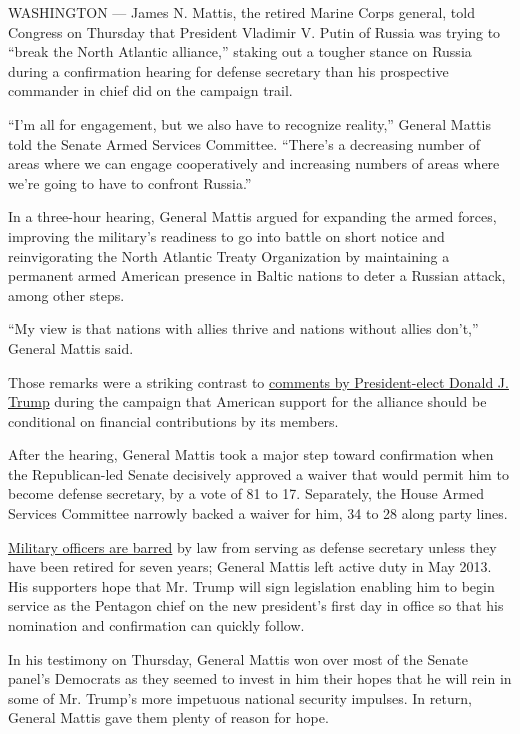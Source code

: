 WASHINGTON --- James N. Mattis, the retired Marine Corps general, told
Congress on Thursday that President Vladimir V. Putin of Russia was
trying to ``break the North Atlantic alliance,'' staking out a tougher
stance on Russia during a confirmation hearing for defense secretary
than his prospective commander in chief did on the campaign trail.

``I'm all for engagement, but we also have to recognize reality,''
General Mattis told the Senate Armed Services Committee. ``There's a
decreasing number of areas where we can engage cooperatively and
increasing numbers of areas where we're going to have to confront
Russia.''

In a three-hour hearing, General Mattis argued for expanding the armed
forces, improving the military's readiness to go into battle on short
notice and reinvigorating the North Atlantic Treaty Organization by
maintaining a permanent armed American presence in Baltic nations to
deter a Russian attack, among other steps.

``My view is that nations with allies thrive and nations without allies
don't,'' General Mattis said.

Those remarks were a striking contrast to
\href{https://www.nytimes.com/2016/07/21/us/politics/donald-trump-issues.html}{comments
by President-elect Donald J. Trump} during the campaign that American
support for the alliance should be conditional on financial
contributions by its members.

After the hearing, General Mattis took a major step toward confirmation
when the Republican-led Senate decisively approved a waiver that would
permit him to become defense secretary, by a vote of 81 to 17.
Separately, the House Armed Services Committee narrowly backed a waiver
for him, 34 to 28 along party lines.

\href{https://www.nytimes.com/2017/01/10/us/politics/james-mattis-defense-secretary.html}{Military
officers are barred} by law from serving as defense secretary unless
they have been retired for seven years; General Mattis left active duty
in May 2013. His supporters hope that Mr. Trump will sign legislation
enabling him to begin service as the Pentagon chief on the new
president's first day in office so that his nomination and confirmation
can quickly follow.

In his testimony on Thursday, General Mattis won over most of the Senate
panel's Democrats as they seemed to invest in him their hopes that he
will rein in some of Mr. Trump's more impetuous national security
impulses. In return, General Mattis gave them plenty of reason for hope.


